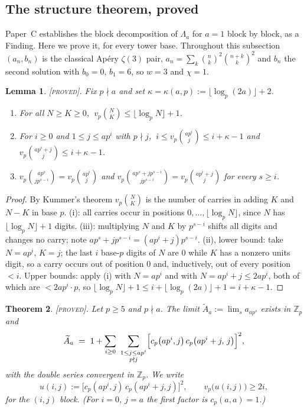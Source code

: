 \documentclass[11pt,reqno]{article}
\newcommand{\Zp}{\mathbb{Z}_p}
\newcommand{\Atil}{\widetilde{A}}
\newcommand{\vp}{v_p}
\newcommand{\bin}[2]{\binom{#1}{#2}}
\newcommand{\floor}[1]{\lfloor #1 \rfloor}
\newcommand{\PROVED}{{\normalfont\textsc{[proved]}}}
\theoremstyle{plain}
\newtheorem{theorem}{Theorem}[section]
\newtheorem{lemma}[theorem]{Lemma}
\theoremstyle{definition}
\theoremstyle{remark}
\numberwithin{equation}{section}
\begin{document}
\subsection{The structure theorem, proved}

Paper~C establishes the block decomposition of $\Lambda_a$ for $a=1$ block by
block, as a Finding.  Here we prove it, for every tower base.  Throughout this
subsection $(a_n,b_n)$ is the classical Ap\'ery $\zeta(3)$ pair,
$a_n=\sum_k\bin nk^2\bin{n+k}k^2$ and $b_n$ the second solution with $b_0=0$,
$b_1=6$, so $w=3$ and $\chi=1$.

\begin{lemma}\label{lem:kummer}
\PROVED.  Fix $p\nmid a$ and set $\kappa=\kappa(a,p):=\floor{\log_p(2a)}+2$.
\begin{enumerate}[label=(\roman*),leftmargin=2em]
\item For all $N\ge K\ge0$, $\ \vp\bin NK\le\floor{\log_pN}+1$.
\item For $i\ge0$ and $1\le j\le ap^i$ with $p\nmid j$,
  $\ i\le\vp\bin{ap^i}{j}\le i+\kappa-1$ and
  $\vp\bin{ap^i+j}{j}\le i+\kappa-1$.
\item $\vp\bin{ap^s}{jp^{s-i}}=\vp\bin{ap^i}{j}$ and
  $\vp\bin{ap^s+jp^{s-i}}{jp^{s-i}}=\vp\bin{ap^i+j}{j}$ for every $s\ge i$.
\end{enumerate}
\end{lemma}

\begin{proof}
By Kummer's theorem \cite[\S1]{Granville1997} $\vp\bin NK$ is the number of
carries in adding $K$ and $N-K$ in base $p$.  (i): all carries occur in
positions $0,\dots,\floor{\log_pN}$, since $N$ has $\floor{\log_pN}+1$ digits.
(iii): multiplying $N$ and $K$ by $p^{s-i}$ shifts all digits and changes no
carry; note $ap^s+jp^{s-i}=(ap^i+j)p^{s-i}$.  (ii), lower bound: take $N=ap^i$,
$K=j$; the last $i$ base-$p$ digits of $N$ are $0$ while $K$ has a nonzero units
digit, so a carry occurs out of position $0$ and, inductively, out of every
position $<i$.  Upper bounds: apply (i) with $N=ap^i$ and with
$N=ap^i+j\le2ap^i$, both of which are $<2ap^{i}\cdot p$, so
$\floor{\log_pN}+1\le i+\floor{\log_p(2a)}+1=i+\kappa-1$.
\end{proof}

\begin{theorem}\label{thm:Atil}
\PROVED.  Let $p\ge5$ and $p\nmid a$.  The limit $\Atil_a:=\lim_sa_{ap^s}$
exists in $\Zp$ and
\begin{equation}\label{eq:Atilblocks}
  \Atil_a\ =\ 1+\sum_{i\ge0}\ \sum_{\substack{1\le j\le ap^i\\ p\nmid j}}
    \Bigl[c_p\bigl(ap^i,j\bigr)\,c_p\bigl(ap^i+j,\,j\bigr)\Bigr]^{2},
\end{equation}
with the double series convergent in $\Zp$.  We write
\begin{equation}\label{eq:udef}
  u(i,j):=\bigl[c_p(ap^i,j)\,c_p(ap^i+j,j)\bigr]^{2},
  \qquad \vp\bigl(u(i,j)\bigr)\ge2i,
\end{equation}
for the $(i,j)$ block.  (For $i=0$, $j=a$ the first factor is $c_p(a,a)=1$.)
\end{theorem}
\end{document}
